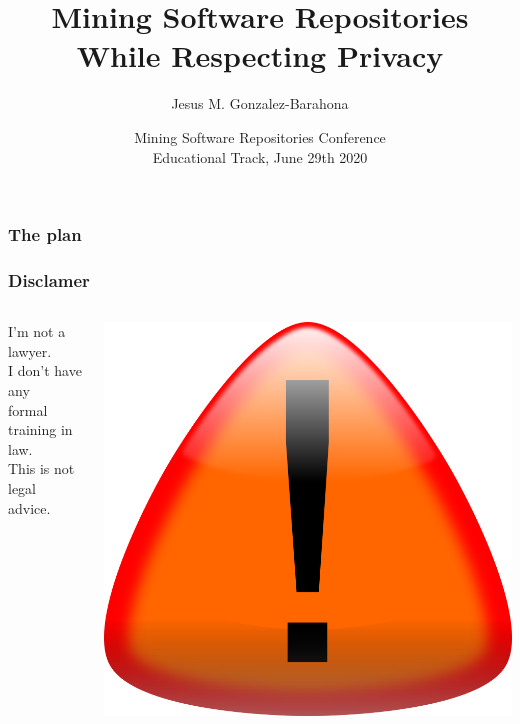 \documentclass[17pt,aspectratio=169,hyperref={pdfusetitle,colorlinks,allcolors=olive}]{beamer}
\title[MSR \& Privacy]{Mining Software Repositories While Respecting Privacy}
\author[Jesus M. Gonzalez-Barahona]{Jesus M. Gonzalez-Barahona}
\institute[URJC]{Universidad Rey Juan Carlos \\
  @jgbarah ~~~~~ \url{https://jgbarah.github.io/presentations}}
\date{Mining Software Repositories Conference \\ Educational Track, June 29th 2020}
\begin{document}
\begin{frame}
  \maketitle
\end{frame}



\begin{frame}
  \frametitle{The plan}
\begin{multicols}{2}
\tableofcontents
\end{multicols}
\end{frame}


\begin{frame}[fragile]
  \frametitle{Disclamer}

\begin{columns}[T]
\begin{column}{.78\textwidth}
  {\Large
    I'm not a lawyer.\\
    \vspace{.8cm}
    I don't have any \\
    formal training in law.\\
    \vspace{.8cm}
    This is not legal advice.\\
  }
\end{column}%
\hfill%
\begin{column}{.20\textwidth}
    \includegraphics[height=\textwidth]{figs/signal-caution}
\end{column}%
\end{columns}
  
\end{frame}
\end{document}
